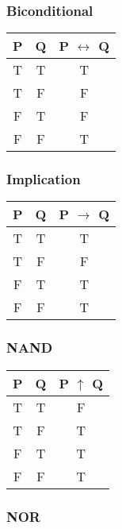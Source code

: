 \begin{multicols}{2}
\subsubsection{Biconditional}

\begin{table}[H]
\centering
\begin{tabular}[t]{|c|c|c|}
\hline
\textbf{P} & \textbf{Q} & \textbf{P $\leftrightarrow$ Q} \\ \hline
T & T & T \\ \hline
T & F & F \\ \hline
F & T & F \\ \hline
F & F & T \\ \hline
\end{tabular}
\end{table}

\subsubsection{Implication}

\begin{table}[H]
\centering
\begin{tabular}[t]{|c|c|c|}
\hline
\textbf{P} & \textbf{Q} & \textbf{P $\to$ Q} \\ \hline
T & T & T \\ \hline
T & F & F \\ \hline
F & T & T \\ \hline
F & F & T \\ \hline
\end{tabular}
\end{table}

\subsubsection{NAND}

\begin{table}[H]
\centering
\begin{tabular}[t]{|c|c|c|}
\hline
\textbf{P} & \textbf{Q} & \textbf{P $\uparrow$ Q} \\ \hline
T & T & F \\ \hline
T & F & T \\ \hline
F & T & T \\ \hline
F & F & T \\ \hline
\end{tabular}
\end{table}

\subsubsection{NOR}


\end{multicols}
